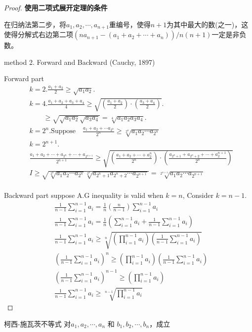 \begin{proof}
\textbf{使用二项式展开定理的条件}

在归纳法第二步，将$ a_1,a_2,\cdots,a_{n+1} $重编号，使得$ {n+1} $为其中最大的数(之一)，这使得分解式右边第二项$ (na_{n+1}-(a_1+a_2+\cdots+a_n))/n(n+1) $一定是非负数。

method 2. Forward and Backward (Cauchy, 1897)

Forward part
\begin{align*}
	&k = 2. \frac{a_1+a_2}{2}\ge \sqrt{a_1a_2}.\\
	&k = 4. \frac{a_1+a_2+a_3+a_4}{4} \ge\sqrt{(\frac{a_1+a_2}{2})\cdot(\frac{a_3+a_4}{2})}.\\
	&\qquad  \ge \sqrt{\sqrt{a_1a_2}\sqrt{a_3a_4}} = \sqrt[4]{a_1a_2a_3a_4}.\\
	&k = 2^n. \text{Suppose}\quad \frac{a_1+a_2+\cdots a_{2^n}}{2^n} \ge \sqrt[2^n]{a_1a_2\cdots a_{2^n}}\\
	&k = 2^{n+1}.\\
	&	\frac{a_1+a_2+\cdots+a_{2^n}+\cdots+a_{2^{n+1}}}{2^{n+1}} \ge \sqrt{(\frac{a_1+a_2+\cdots+a_2^{n}}{2^n})\cdot(\frac{a_{2^{n} + 1}+a_{2^{n}+2}+\cdots+a_2^{n+1}}{2^n})}\\
	&I\ge \sqrt{\sqrt[2^n]{a_1a_2\cdots a_{2^n}}\sqrt[2^n]{a_{2^n+1} a_{2^n+2}\cdots a_{2^{n+1}}}} = \sqrt[2^{n+1}]{a_1a_2\cdots a_{2^{n+1}}}\\
\end{align*}

Backward part
suppose A.G inequality is valid when $ k = n $, Consider $ k = n-1 $.
\begin{align*}
	&\frac{1}{n-1}\sum_{i=1}^{n-1} a_i = \frac{1}{n}(\frac{n}{n-1})\sum_{i=1}^{n-1}a_i\\
	&\frac{1}{n-1}\sum_{i=1}^{n-1} a_i = \frac{1}{n}(\sum_{i=1}^{n-1} a_i + \frac{1}{n-1} \sum_{i=1}^{n-1} a_i)\\
	&\frac{1}{n-1} \sum_{i=1}^{n-1} a_i \ge \sqrt[n]{(\prod_{i=1}^{n-1} a_i)(\frac{1}{n-1}\sum_{i=1}^{n-1} a_i)}\\
	&(\frac{1}{n-1} \sum_{i=1}^{n-1} a_i)^n \ge (\prod_{i=1}^{n-1} a_i)(\frac{1}{n-1}\sum_{i=1}^{n-1} a_i)\\
	&(\frac{1}{n-1} \sum_{i=1}^{n-1} a_i)^{n-1} \ge (\prod_{i=1}^{n-1} a_i)\\
	&\frac{1}{n-1} \sum_{i=1}^{n-1} a_i \ge \sqrt[n-1]{\prod_{i=1}^{n-1} a_i}
\end{align*}
\end{proof}

\begin{proposition}[1.3.5]
	 柯西-施瓦茨不等式
	对$ a_1,a_2,\cdots,a_n $ 和 $ b_1,b_2,\cdots,b_n $，成立
\end{proposition}


